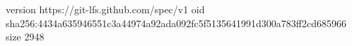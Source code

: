 version https://git-lfs.github.com/spec/v1
oid sha256:4434a635946551c3a44974a92ada092fc5f5135641991d300a783ff2cd685966
size 2948
